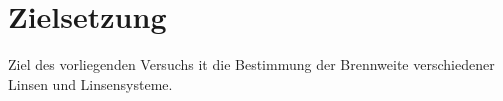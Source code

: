 \section{Zielsetzung}
\label{sec:Zielsetzung}
Ziel des vorliegenden Versuchs it die Bestimmung der Brennweite verschiedener Linsen und Linsensysteme.
